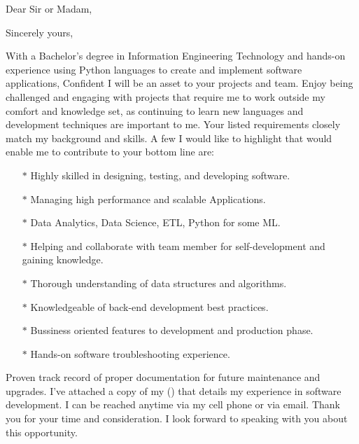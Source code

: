 \documentclass{subfiles}
\begin{document}
\clearpage
{} %
\date{\today} %
\opening{Dear Sir or Madam,} %
\closing{Sincerely yours,} %

\makelettertitle %
With a Bachelor’s degree in Information Engineering Technology and hands-on experience using Python languages to create and implement software applications, Confident I will be an asset to your projects and team.
\newline
Enjoy being challenged and engaging with projects that require me to work outside my comfort and knowledge set, as continuing to learn new languages and development techniques are important to me.
\newline
Your listed requirements closely match my background and skills. A few I would like to highlight that would enable me to contribute to your bottom line are:

\begin{itemize}
        \item[$\ast$] Highly skilled in designing, testing, and developing software.
        \item[$\ast$] Managing high performance and scalable Applications.
        \item[$\ast$] Data Analytics, Data Science, ETL, Python for some ML.
        \item[$\ast$] Helping and collaborate with team member for self-development and gaining knowledge.
        \item[$\ast$] Thorough understanding of data structures and algorithms.
        \item[$\ast$] Knowledgeable of back-end development best practices.
        \item[$\ast$] Bussiness oriented features to development and production phase.
        \item[$\ast$] Hands-on software troubleshooting experience.
\end{itemize}

Proven track record of proper documentation for future maintenance and upgrades.
I’ve attached a copy of my  () that details my experience in software development. I can be reached anytime via my cell phone or via email.
\newline
Thank you for your time and consideration. I look forward to speaking with you about this opportunity.

\makeletterclosing %

\newpage
\end{document}
